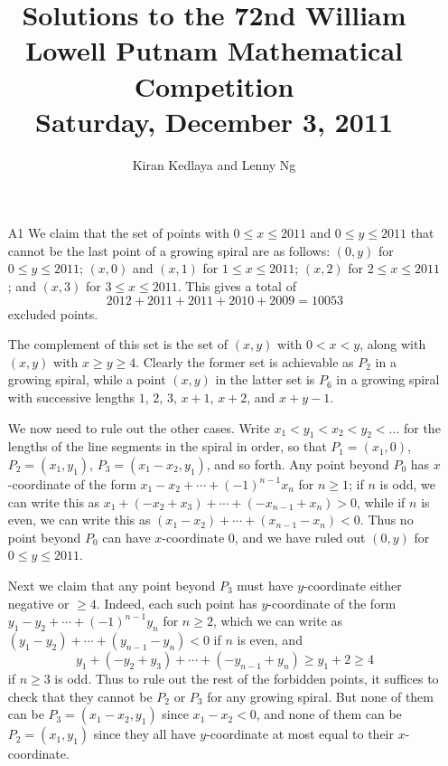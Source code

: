 \documentclass[amssymb,twocolumn,pra,10pt,aps]{revtex4-1}
\begin{document}
\title{Solutions to the 72nd William Lowell Putnam Mathematical Competition \\
    Saturday, December 3, 2011}
\author{Kiran Kedlaya and Lenny Ng}
\noaffiliation
\maketitle

\begin{itemize}

\item[A1] We claim that the set of points with $0\leq x\leq 2011$ and $0\leq
y\leq 2011$ that cannot be the last point of a growing spiral are as follows:
$(0,y)$ for $0\leq y\leq 2011$; $(x,0)$ and $(x,1)$ for $1\leq x\leq 2011$;
$(x,2)$ for $2\leq x\leq 2011$; and $(x,3)$ for $3\leq x\leq 2011$. This
gives a total of
\[
2012 + 2011 + 2011 + 2010 + 2009 = 10053
\]
excluded points.

The complement of this set is the set of $(x,y)$ with $0<x<y$, along with
$(x,y)$ with $x \geq y \geq 4$. Clearly the former set is achievable as
$P_2$ in a growing spiral, while a point $(x,y)$ in the latter set is $P_6$
in a growing spiral with successive lengths $1$, $2$, $3$, $x+1$, $x+2$,
and $x+y-1$.

We now need to rule out the other cases. Write $x_1<y_1<x_2<y_2<\ldots$
for the lengths of the line segments in the spiral in order, so that $P_1 =
(x_1,0)$, $P_2 = (x_1,y_1)$, $P_3 = (x_1-x_2,y_1)$, and so forth. Any point
beyond $P_0$ has $x$-coordinate of the form $x_1-x_2+\cdots+(-1)^{n-1}
x_n$ for $n\geq 1$; if $n$ is odd, we can write this as $x_1 + (-x_2+x_3)
+ \cdots + (-x_{n-1}+x_n) > 0$, while if $n$ is even, we can write this as
$(x_1-x_2) + \cdots + (x_{n-1}-x_n) < 0$. Thus no point beyond $P_0$ can have
$x$-coordinate $0$, and we have ruled out $(0,y)$ for $0\leq y\leq 2011$.

Next we claim that any point beyond $P_3$ must have $y$-coordinate either
negative or $\geq 4$. Indeed, each such point has $y$-coordinate of the
form $y_1-y_2+\cdots+(-1)^{n-1} y_n$ for $n \geq 2$, which we can write
as $(y_1-y_2) + \cdots + (y_{n-1}-y_n) < 0$ if $n$ is even, and
\[
y_1 +(-y_2+y_3) + \cdots + (-y_{n-1}+y_n) \geq y_1 + 2 \geq 4
\]
if $n \geq 3$
is odd. Thus to rule out the rest of the forbidden points, it suffices to
check that they cannot be $P_2$ or $P_3$ for any growing spiral. But none
of them can be $P_3 = (x_1-x_2,y_1)$ since $x_1-x_2<0$, and none of them
can be $P_2 = (x_1,y_1)$ since they all have $y$-coordinate at most equal
to their $x$-coordinate.


\end{itemize}
\end{document}
